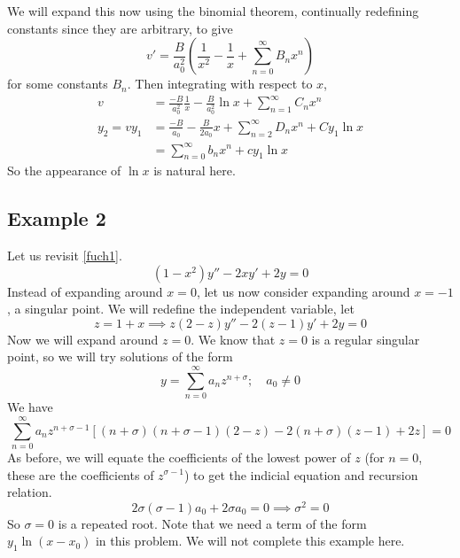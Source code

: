 \begin{itemize}
	      We will expand this now using the binomial theorem, continually redefining constants since they are arbitrary, to give
	      \[
		      v' = \frac{B}{a_0^2}\left( \frac{1}{x^2} - \frac{1}{x} + \sum_{n=0}^\infty B_n x^n \right)
	      \]
	      for some constants \(B_n\).
	      Then integrating with respect to \(x\),
	      \begin{align*}
		      v          & = \frac{-B}{a_0^2}\frac{1}{x} - \frac{B}{a_0^2}\ln x + \sum_{n=1}^\infty C_n x^n \\
		      y_2 = vy_1 & = \frac{-B}{a_0} - \frac{B}{2a_0}x + \sum_{n=2}^\infty D_n x^n + Cy_1\ln x       \\
		                 & = \sum_{n=0}^\infty b_n x^n + cy_1\ln x
	      \end{align*}
	      So the appearance of \(\ln x\) is natural here.
\end{itemize}

\subsection{Example 2}
Let us revisit \eqref{fuch1}.
\[
	(1-x^2)y'' - 2xy' + 2y = 0
\]
Instead of expanding around \(x=0\), let us now consider expanding around \(x=-1\), a singular point.
We will redefine the independent variable, let
\[
	z = 1 + x \implies z(2-z)y'' - 2(z-1)y' + 2y = 0
\]
Now we will expand around \(z=0\).
We know that \(z=0\) is a regular singular point, so we will try solutions of the form
\[
	y = \sum_{n=0}^\infty a_n z^{n+\sigma};\quad a_0 \neq 0
\]
We have
\[
	\sum_{n=0}^\infty a_n z^{n+\sigma-1}\left[ (n+\sigma)(n+\sigma-1)(2-z) - 2(n+\sigma)(z-1) + 2z \right] = 0
\]
As before, we will equate the coefficients of the lowest power of \(z\) (for \(n=0\), these are the coefficients of \(z^{\sigma - 1}\)) to get the indicial equation and recursion relation.
\[
	2\sigma(\sigma - 1)a_0 + 2\sigma a_0 = 0 \implies \sigma^2 = 0
\]
So \(\sigma = 0\) is a repeated root.
Note that we need a term of the form \(y_1\ln (x-x_0)\) in this problem.
We will not complete this example here.
